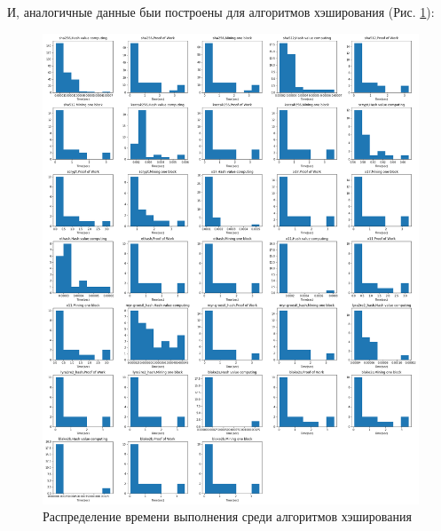 И, аналогичные данные быи построены для алгоритмов хэширования (Рис. \ref{hash}):

\begin{figure}
    \centering
    \includegraphics[width=\textwidth]{./images/hists_hashing}
    \caption{Распределение времени выполнения среди алгоритмов хэширования}\label{hash}
\end{figure}



